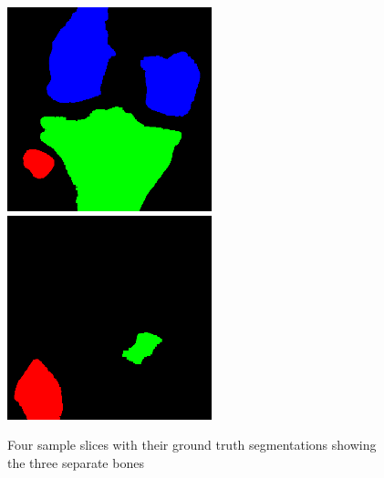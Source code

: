 \begin{figure}[H]
\endminipage\hfill
{}%
  \includegraphics[width=\linewidth]{imgs/y3.png}
\endminipage\hfill
{}%
  \includegraphics[width=\linewidth]{imgs/y4.png}
\endminipage
\caption{Four sample slices with their ground truth segmentations showing the three separate bones}
\end{figure}

